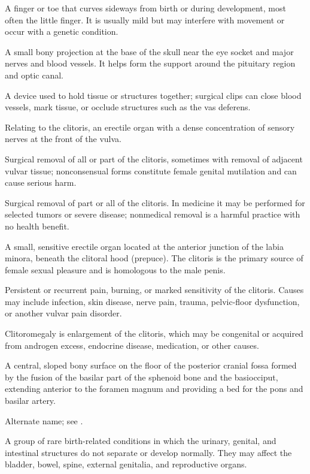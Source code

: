  A finger or toe that curves sideways from birth or during development, most often the little finger. It is usually mild but may interfere with movement or occur with a genetic condition.

 A small bony projection at the base of the skull near the eye socket and major nerves and blood vessels. It helps form the support around the pituitary region and optic canal.

 A device used to hold tissue or structures together; surgical clips can close blood vessels, mark tissue, or occlude structures such as the vas deferens.

 Relating to the clitoris, an erectile organ with a dense concentration of sensory nerves at the front of the vulva.

 Surgical removal of all or part of the clitoris, sometimes with removal of adjacent vulvar tissue; nonconsensual forms constitute female genital mutilation and can cause serious harm.

 Surgical removal of part or all of the clitoris. In medicine it may be performed for
selected tumors or severe disease; nonmedical removal is a harmful practice with no
health benefit.

 A small, sensitive erectile organ located at the anterior junction of the labia minora,
beneath the clitoral hood (prepuce). The clitoris is the primary source of female sexual
pleasure and is homologous to the male penis.

 Persistent or recurrent pain, burning, or marked sensitivity of the clitoris. Causes may include infection, skin disease, nerve pain, trauma, pelvic-floor dysfunction, or another vulvar pain disorder.

 Clitoromegaly is enlargement of the clitoris, which may be congenital or acquired from androgen excess, endocrine disease, medication, or other causes.

 A central, sloped bony surface on the floor of the posterior cranial fossa formed by the fusion of the basilar part of the sphenoid bone and the basiocciput, extending anterior to the foramen magnum and providing a bed for the pons and basilar artery.

 Alternate name; see .

 A group of rare birth-related conditions in which the urinary, genital, and intestinal structures do not separate or develop normally. They may affect the bladder, bowel, spine, external genitalia, and reproductive organs.

